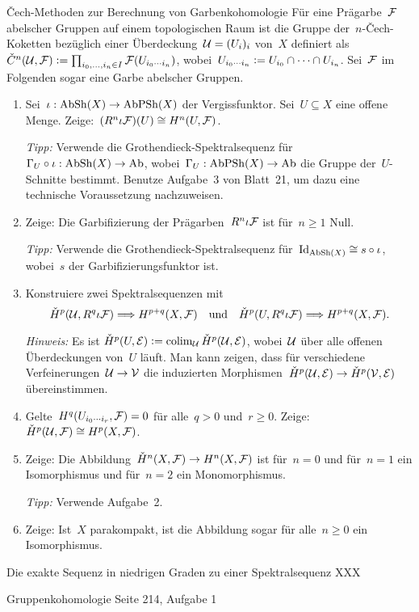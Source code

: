 \documentclass{uebblatt}
\begin{document}

\begin{aufgabe}{Čech-Methoden zur Berechnung von Garbenkohomologie}
Für eine Prägarbe~$\mathcal{F}$ abelscher Gruppen auf einem topologischen Raum ist die
Gruppe der~$n$-Čech-Koketten bezüglich einer Überdeckung~$\mathcal{U} = (U_i)_i$ von~$X$
definiert als~$\check C^n(\mathcal{U}, \mathcal{F}) \vcentcolon= \prod_{i_0,\ldots,i_n \in I}
\mathcal{F}(U_{i_0 \cdots i_n})$, wobei~$U_{i_0 \cdots i_n} \vcentcolon= U_{i_0} \cap \cdots
\cap U_{i_n}$. Sei~$\mathcal{F}$ im Folgenden sogar eine Garbe abelscher Gruppen.
\begin{enumerate}
\item Sei~$\iota : \mathrm{AbSh}(X) \to
\mathrm{AbPSh}(X)$ der Vergissfunktor. Sei~$U \subseteq X$ eine offene Menge.
Zeige:~$(R^n \iota\mathcal{F})(U) \cong H^n(U, \mathcal{F})$.

{\tiny\emph{Tipp:} Verwende die Grothendieck-Spektralsequenz für~$\Gamma_U
\circ \iota : \mathrm{AbSh}(X) \to \mathrm{Ab}$, wobei~$\Gamma_U : \mathrm{AbPSh}(X) \to \mathrm{Ab}$ die
Gruppe der~$U$-Schnitte bestimmt. Benutze Aufgabe~3 von Blatt~21, um dazu eine
technische Voraussetzung nachzuweisen.\par}
\item Zeige: Die Garbifizierung der Prägarben~$R^n \iota \mathcal{F}$ ist für~$n \geq 1$
Null.

{\tiny\emph{Tipp:} Verwende die Grothendieck-Spektralsequenz
für~$\mathrm{Id}_{\mathrm{AbSh}(X)} \cong s \circ \iota$, wobei~$s$ der Garbifizierungsfunktor
ist.\par}
\item Konstruiere zwei Spektralsequenzen mit
\[ \check H^p(\mathcal{U}, R^q \iota \mathcal{F}) \Longrightarrow H^{p+q}(X, \mathcal{F})
  \quad\text{und}\quad
  \check H^p(U, R^q \iota \mathcal{F}) \Longrightarrow H^{p+q}(X, \mathcal{F}). \]
{\tiny\emph{Hinweis:} Es ist $\check H^p(U,\mathcal{E}) \vcentcolon= \operatorname{colim}_{\mathcal{U}} \check H^p(\mathcal{U},\mathcal{E})$,
wobei~$\mathcal{U}$ über alle offenen Überdeckungen von~$U$ läuft. Man kann zeigen, dass
für verschiedene Verfeinerungen~$\mathcal{U} \to \mathcal{V}$ die induzierten
Morphismen~$\check H^p(\mathcal{U},\mathcal{E}) \to \check H^p(\mathcal{V},\mathcal{E})$ übereinstimmen.\par}
\item Gelte~$H^q(U_{i_0 \cdots i_r}, \mathcal{F}) = 0$ für alle~$q > 0$ und~$r \geq 0$.
Zeige: $\check H^p(\mathcal{U}, \mathcal{F}) \cong H^p(X, \mathcal{F})$.
\item Zeige: Die Abbildung~$\check H^n(X,\mathcal{F}) \to H^n(X,\mathcal{F})$ ist für~$n = 0$ und
für~$n = 1$ ein Isomorphismus und für~$n = 2$ ein Monomorphismus.

{\tiny\emph{Tipp:} Verwende Aufgabe~2.\par}
\item Zeige: Ist~$X$ parakompakt, ist die Abbildung sogar für alle~$n \geq 0$ ein
Isomorphismus.
\end{enumerate}
\end{aufgabe}

\begin{aufgabe}{Die exakte Sequenz in niedrigen Graden zu einer
Spektralsequenz}
XXX
\end{aufgabe}

\begin{aufgabe}{Gruppenkohomologie}
Seite 214, Aufgabe 1
\end{aufgabe}
\end{document}
